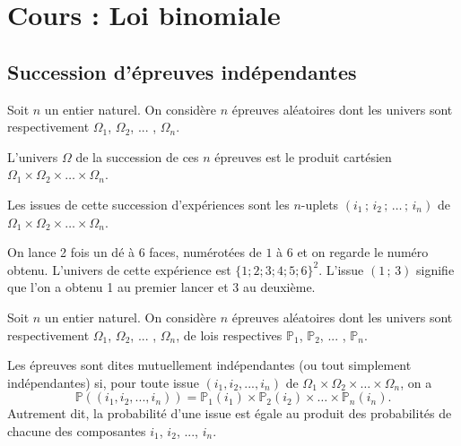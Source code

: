 \documentclass[11pt,fleqn, openany]{book} %
\begin{document}


\chapter{Cours : Loi binomiale}


\section{Succession d'épreuves indépendantes}



\begin{definition}Soit $n$ un entier naturel. On considère $n$ épreuves aléatoires dont les univers sont respectivement $\Omega_1$, $\Omega_2$, ... , $\Omega_n$.

L'univers $\Omega$ de la succession de ces $n$ épreuves est le produit cartésien $\Omega_1 \times \Omega_2 \times \dots \times \Omega_n$.

Les issues de cette succession d'expériences sont les $n$-uplets $(i_1\, ;\, i_2\,;\,\dots\,;\,i_n)$ de $\Omega_1 \times \Omega_2 \times \dots \times \Omega_n$.\end{definition}

\begin{example}On lance 2 fois un dé à 6 faces, numérotées de $1$ à $6$ et on regarde le numéro obtenu. L'univers de cette expérience est $\{1;2;3;4;5;6\}^2$. L'issue $(1\,;\,3)$ signifie que l'on a obtenu 1 au premier lancer et 3 au deuxième.\end{example}

\begin{definition}Soit $n$ un entier naturel. On considère $n$ épreuves aléatoires dont les univers sont respectivement $\Omega_1$, $\Omega_2$, ... , $\Omega_n$, de lois respectives $\mathbb{P}_1$, $\mathbb{P}_2$, ... , $\mathbb{P}_n$.

Les épreuves sont dites mutuellement indépendantes (ou tout simplement indépendantes) si, pour toute issue $(i_1,i_2,...,i_n)$ de $\Omega_1 \times \Omega_2 \times \dots \times \Omega_n$, on a
\[ \mathbb{P}((i_1,i_2,...,i_n))=\mathbb{P}_1(i_1) \times \mathbb{P}_2(i_2) \times \dots \times \mathbb{P}_n(i_n).\]
Autrement dit, la probabilité d'une issue est égale au produit des probabilités de chacune des composantes $i_1$, $i_2$, ..., $i_n$.\end{definition}
\end{document}
